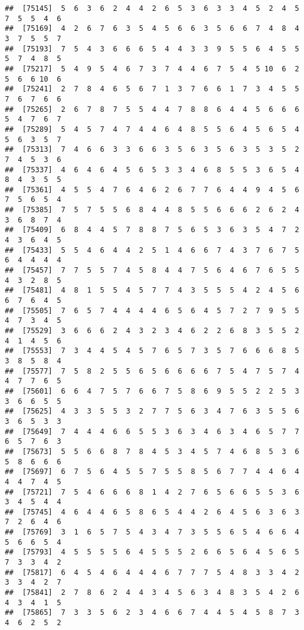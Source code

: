\documentclass[
]{book}
\begin{document}
\begin{verbatim}
##  [75145]  5  6  3  6  2  4  4  2  6  5  3  6  3  3  4  5  2  4  5  7  5  5  4  6
##  [75169]  4  2  6  7  6  3  5  4  5  6  6  3  5  6  6  7  4  8  4  3  7  5  5  7
##  [75193]  7  5  4  3  6  6  6  5  4  4  3  3  9  5  5  6  4  5  5  5  7  4  8  5
##  [75217]  5  4  9  5  4  6  7  3  7  4  4  6  7  5  4  5 10  6  2  5  6  6 10  6
##  [75241]  2  7  8  4  6  5  6  7  1  3  7  6  6  1  7  3  4  5  5  7  6  7  6  6
##  [75265]  2  6  7  8  7  5  5  4  4  7  8  8  6  4  4  5  6  6  6  5  4  7  6  7
##  [75289]  5  4  5  7  4  7  4  4  6  4  8  5  5  6  4  5  6  5  4  5  6  3  5  7
##  [75313]  7  4  6  6  3  3  6  6  3  5  6  3  5  6  3  5  3  5  2  7  4  5  3  6
##  [75337]  4  6  4  6  4  5  6  5  3  3  4  6  8  5  5  3  6  5  4  8  4  3  5  5
##  [75361]  4  5  5  4  7  6  4  6  2  6  7  7  6  4  4  9  4  5  6  7  5  6  5  4
##  [75385]  7  5  7  5  5  6  8  4  4  8  5  5  6  6  6  2  6  2  4  3  6  8  7  4
##  [75409]  6  8  4  4  5  7  8  8  7  5  6  5  3  6  3  5  4  7  2  4  3  6  4  5
##  [75433]  5  5  4  6  4  4  2  5  1  4  6  6  7  4  3  7  6  7  5  6  4  4  4  4
##  [75457]  7  7  5  5  7  4  5  8  4  4  7  5  6  4  6  7  6  5  5  4  3  2  8  5
##  [75481]  4  8  1  5  5  4  5  7  7  4  3  5  5  5  4  2  4  5  6  6  7  6  4  5
##  [75505]  7  6  5  7  4  4  4  4  6  5  6  4  5  7  2  7  9  5  5  4  7  3  4  5
##  [75529]  3  6  6  6  2  4  3  2  3  4  6  2  2  6  8  3  5  5  2  4  1  4  5  6
##  [75553]  7  3  4  4  5  4  5  7  6  5  7  3  5  7  6  6  6  8  5  3  8  5  8  4
##  [75577]  7  5  8  2  5  5  6  5  6  6  6  6  7  5  4  7  5  7  4  4  7  7  6  5
##  [75601]  6  6  4  7  5  7  6  6  7  5  8  6  9  5  5  2  2  5  3  3  6  6  5  5
##  [75625]  4  3  3  5  5  3  2  7  7  5  6  3  4  7  6  3  5  5  6  3  6  5  3  3
##  [75649]  7  4  4  4  6  6  5  5  3  6  3  4  6  3  4  6  5  7  7  6  5  7  6  3
##  [75673]  5  5  6  6  8  7  8  4  5  3  4  5  7  4  6  8  5  3  6  5  8  6  6  6
##  [75697]  6  7  5  6  4  5  5  7  5  5  8  5  6  7  7  4  4  6  4  4  4  7  4  5
##  [75721]  7  5  4  6  6  6  8  1  4  2  7  6  5  6  6  5  5  3  6  3  4  5  4  4
##  [75745]  4  6  4  4  6  5  8  6  5  4  4  2  6  4  5  6  3  6  3  7  2  6  4  6
##  [75769]  3  1  6  5  7  5  4  3  4  7  3  5  5  6  5  4  6  6  4  5  6  6  5  4
##  [75793]  4  5  5  5  5  6  4  5  5  5  2  6  6  5  6  4  5  6  5  7  3  3  4  2
##  [75817]  6  4  5  4  6  4  4  4  6  7  7  7  5  4  8  3  3  4  2  3  3  4  2  7
##  [75841]  2  7  8  6  2  4  4  3  4  5  6  3  4  8  3  5  4  2  6  4  3  4  1  5
##  [75865]  7  3  3  5  6  2  3  4  6  6  7  4  4  5  4  5  8  7  3  4  6  2  5  2

\end{verbatim}
\end{document}
